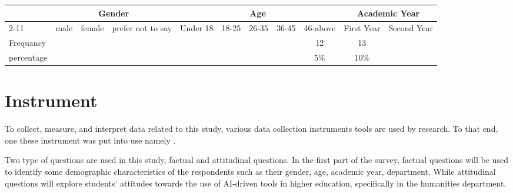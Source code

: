 \begin{table}[H]
	\begin{tabular}{|l|ccc|ccccc|cc|}
		\hline
		\multirow{3}{*}{} & \multicolumn{3}{c|}{Gender} & \multicolumn{5}{c|}{Age}    & \multicolumn{2}{c|}{Academic Year}                                                                                                                                                                                                                        \\ \cline{2-11}
		                  & \multicolumn{1}{c|}{male}   & \multicolumn{1}{c|}{female} & prefer not to say                  & \multicolumn{1}{c|}{Under 18} & \multicolumn{1}{c|}{18-25} & \multicolumn{1}{c|}{26-35} & \multicolumn{1}{c|}{36-45} & 46-above                 & \multicolumn{1}{c|}{First Year} & \multicolumn{1}{c|}{Second Year} \\ \hline
		Frequancy         & \multicolumn{1}{c|}{}       & \multicolumn{1}{c|}{}       &                                    & \multicolumn{1}{c|}{}         & \multicolumn{1}{c|}{}      & \multicolumn{1}{c|}{}      & \multicolumn{1}{c|}{}      & \multicolumn{1}{c|}{12}  & \multicolumn{1}{c|}{13}                                            \\ \hline
		percentage        & \multicolumn{1}{c|}{}       & \multicolumn{1}{c|}{}       &                                    & \multicolumn{1}{c|}{}         & \multicolumn{1}{c|}{}      & \multicolumn{1}{c|}{}      & \multicolumn{1}{c|}{}      & \multicolumn{1}{c|}{5\%} & \multicolumn{1}{c|}{10\%}                                          \\ \hline
	\end{tabular}
\end{table}



\section{Instrument}
\justifying
To collect, measure, and interpret data related to this study, various
data collection instruments tools are used by research. To that end, one these
instrument was put into use namely .



Two type of questions are used in this study, factual and attitudinal questions.
In the first part of the survey, factual questions will be used to identify
some demographic characteristics of the respondents such as their gender, age, academic
year, department. While attitudinal questions will explore students' attitudes towards
the use of AI-driven tools in higher education, specifically in the humanities department.



